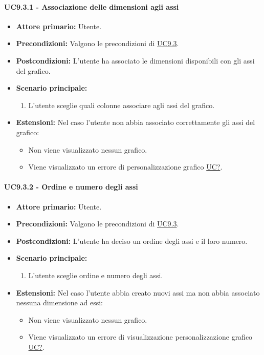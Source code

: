 \paragraph{UC9.3.1 - Associazione delle dimensioni agli assi}
\label{sec:UC9.3.1}
    \begin{itemize}
        \item \textbf{Attore primario:} Utente.
        \item \textbf{Precondizioni:} Valgono le precondizioni di \hyperref[sec:UC9.3]{UC9.3}.
	    \item \textbf{Postcondizioni:} L'utente ha associato le dimensioni disponibili con gli assi del grafico.
	    \item \textbf{Scenario principale:} 
	    \begin{enumerate}
	    		\item L'utente sceglie quali colonne associare agli assi del grafico.
		\end{enumerate}
	    \item \textbf{Estensioni:} Nel caso l'utente non abbia associato correttamente gli assi del grafico:
              \begin{itemize}
                  \item Non viene visualizzato nessun grafico.
                  \item Viene visualizzato un errore di personalizzazione grafico \hyperref[sec:UC - Errore di personalizzazione]{UC?}.
              \end{itemize}
    \end{itemize}
    
\paragraph{UC9.3.2 - Ordine e numero degli assi}
\label{sec:UC9.3.2}
    \begin{itemize}
        \item \textbf{Attore primario:} Utente.
        \item \textbf{Precondizioni:} Valgono le precondizioni di \hyperref[sec:UC9.3]{UC9.3}.
	    \item \textbf{Postcondizioni:} L'utente ha deciso un ordine degli assi e il loro numero.
	    \item \textbf{Scenario principale:} 
	    \begin{enumerate}
	    		\item L'utente sceglie ordine e numero degli assi.
		\end{enumerate}
	    \item \textbf{Estensioni:} Nel caso l'utente abbia creato nuovi assi ma non abbia associato nessuna dimensione ad essi:
              \begin{itemize}
                  \item Non viene visualizzato nessun grafico.
                  \item Viene visualizzato un errore di visualizzazione personalizzazione grafico \hyperref[sec:UC - Errore di personalizzazione]{UC?}.
              \end{itemize}
    \end{itemize}



